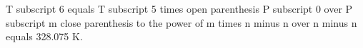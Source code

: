 T subscript 6 equals T subscript 5 times open parenthesis P subscript 0 over P subscript m close parenthesis to the power of m times n minus n over n minus n equals 328.075 K.
